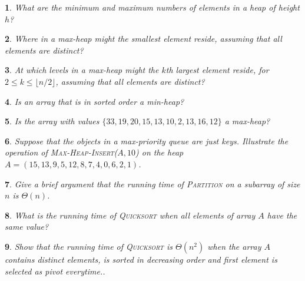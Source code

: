 \documentclass[%
addpoints]{exam}
\theoremstyle{problem}
\newtheorem{p}{}
\begin{document}

\begin{p}
What are the minimum and maximum numbers of elements in a heap of height \( h \)?
\hfill\end{p}

\begin{p}
Where in a max-heap might the smallest element reside, assuming that all elements are distinct?
\hfill\end{p}

\begin{p} 
At which levels in a max-heap might the \( k \)th largest element reside, for \( 2 \leq k \leq \lfloor n/2 \rfloor \), assuming that all elements are distinct?  
\hfill  
\end{p}

\begin{p} 
Is an array that is in sorted order a min-heap?  
\hfill  
\end{p}

\begin{p} 
Is the array with values \( \{33, 19, 20, 15, 13, 10, 2, 13, 16, 12\} \) a max-heap?  
\hfill  
\end{p}

\begin{p} 
Suppose that the objects in a max-priority queue are just keys. Illustrate the operation of \textsc{Max-Heap-Insert}(\( A, 10 \)) on the heap \( A = (15, 13, 9, 5, 12, 8, 7, 4, 0, 6, 2, 1) \).  
\hfill  
\end{p}


\begin{p} 
Give a brief argument that the running time of \textsc{Partition} on a subarray of size \( n \) is \( \Theta(n) \).  
\hfill  
\end{p}

\begin{p} 
What is the running time of \textsc{Quicksort} when all elements of array \( A \) have the same value?  
\hfill  
\end{p}

\begin{p} 
Show that the running time of \textsc{Quicksort} is \( \Theta(n^2) \) when the array \( A \) contains distinct elements, is sorted in decreasing order and first element is selected as pivot everytime..  
\hfill  
\end{p}
\end{document}
